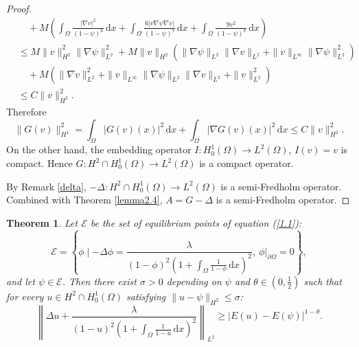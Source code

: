 \documentclass{article}
\numberwithin{equation}{section}
\newtheorem{theorem}{Theorem}[section]
\begin{document}
\begin{proof}
\begin{align*}
        &\quad+M\left(\int_{\Omega}\frac{|\nabla v|^2}{(1-\psi)^6}\,\mathrm{d}x+\int_{\Omega}\frac{6|v\nabla\psi\nabla v|}{(1-\psi)^7}\,\mathrm{d}x+\int_{\Omega}\frac{9v^2}{(1-\psi)^8}\,\mathrm{d}x\right)\\
        &\le M\|v\|_{H^2}^2\|\nabla \psi\|_{L^2}^2+M\|v\|_{H^2}\left(\|\nabla \psi\|_{L^2}\|\nabla v\|_{L^2}+\|v\|_{L^\infty}\|\nabla\psi\|_{L^2}^2\right)\\
        &\quad+M\left(\|\nabla v\|_{L^2}^2+\|v\|_{L^\infty}\|\nabla \psi\|_{L^2}\|\nabla v\|_{L^2}+\|v\|_{L^2}^2\right)\\
        &\le C\|v\|_{H^2}^2.
    \end{align*}
    Therefore
    $$\|G(v)\|_{H^1}^2=\int_{\Omega}|G(v)(x)|^2\,\mathrm{d}x+\int_{\Omega}|\nabla G(v)(x)|^2\,\mathrm{d}x\le C\|v\|_{H^2}^2.$$
    On the other hand, the embedding operator $I:H_0^1(\Omega)\to L^{2}(\Omega)$, $I(v)=v$ is compact. Hence $G:H^2\cap H_0^1(\Omega)\to L^{2}(\Omega)$ is a compact operator.

    By Remark \ref{delta}, $-\Delta:H^2\cap H_0^1(\Omega)\to L^{2}(\Omega)$ is a semi-Fredholm operator. Combined with Theorem \ref{lemma2.4}, $A=G-\Delta$ is a semi-Fredholm operator.
\end{proof}

\begin{theorem}\label{theorem2.1}
    Let $\mathscr{E}$ be the set of equilibrium points of equation (\ref{1.1}):
    $$\mathscr{E}=\left\{\phi\mid -\Delta\phi=\frac{\lambda}{(1-\phi)^2(1+\int_{\Omega}\frac{1}{1-\phi}\,\mathrm{d}x)^2},\  \phi|_{\partial\Omega}=0\right\},$$
    and let $\psi\in\mathscr{E}$. Then there exist $\sigma>0$ depending on $\psi$ and $\theta\in (0,\frac{1}{2})$ such that for every $u\in H^2\cap H_0^1(\Omega)$ satisfying $\|u-\psi\|_{H^2}\le\sigma$:
    \begin{equation}
        \left\|\Delta u+\frac{\lambda}{(1-u)^2(1+\int_{\Omega}\frac{1}{1-u}\,\mathrm{d}x)^2}\right\|_{L^2}\ge |E(u)-E(\psi)|^{1-\theta}.\label{2.11}
    \end{equation}
\end{theorem}
\end{document}
